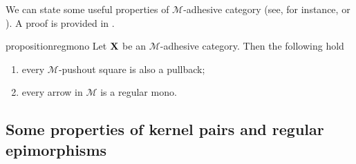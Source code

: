 \documentclass[a4paper,UKenglish,cleveref,pdftex,amsthm,thm-restate,numberwithinsect]{cas-sc}
\theoremstyle{plain}
\theoremstyle{definition}
\newtheorem{remark}[theorem]{Remark}
\def\C{\textbf {\textup{C}}}
\def\X{\textbf {\textup{X}}}
\begin{document}
\iffalse 
\begin{remark}\label{rem:deco}
We can point out an important property of strict $\mathcal{M}$-adhesive categories with pullbacks.  Consider the solid part of the cube aside, whose bottom case is an $\mathcal{M}$-pushout.
	
	\parbox{9.5cm}{	Given an arrow $d\colon X\to D$, we can present the object $X$ has a pushout: indeed, consider the following cube, in which all the three vertical squares are pullbacks.}
	\parbox{3cm}{
	\xymatrix@C=15pt@R=9pt{&V\ar[dd]|\hole_(.65){a}\ar[rr]^{v} \ar@{>.>}[dl]_{u} && Y \ar[dd]^{b} \ar@{>->}[dl]_{y} \\ Z  \ar[dd]_{c}\ar[rr]^(.7){z} & & X \ar[dd]_(.3){d}\\&A\ar[rr]|\hole^(.65){f} \ar@{>->}[dl]^{m} && B \ar@{>->}[dl]^{n} \\C \ar[rr]_{g} & & D }}

Now, notice that, since the front square is a pullback, then the dotted arrow $u\colon V\to Z$ exists. Moreover, the usual composition and decomposition property of pullbacks \cite{mac2013categories} entails that the left face of the cube so obtained is a pullback too, proving that $u$ is in $\mathcal{M}$ and that the top square is a pushout.

	Clearly if the arrow $p\colon X\to D$ is in $\mathcal{M}$, we can omit the assumptions of strictness and the existence of all pullbacks.
\end{remark}
\fi 


We can state some useful properties of $\mathcal{M}$-adhesive category
(see, for instance, \cite[Thm.~4.26]{ehrig2006fundamentals} or \cite[Fact 2.6]{azzi2019essence}). A proof is provided in .
\begin{restatable}{proposition}{regmono}\label{prop:regmono}
	Let $\X$ be an $\mathcal{M}$-adhesive category. Then the following hold
	\begin{enumerate}
		\item every $\mathcal{M}$-pushout square is also a pullback;
		\item every arrow in $\mathcal{M}$ is a regular mono.
	\end{enumerate}
\end{restatable}


\subsection{Some properties of kernel pairs and regular epimorphisms}
\end{document}
